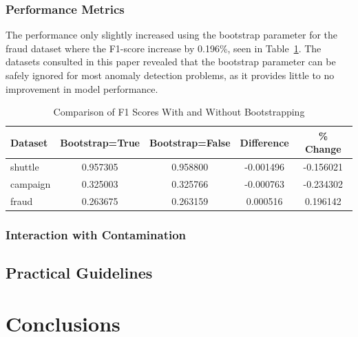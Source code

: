 \documentclass[10pt, conference]{IEEEtran}
\begin{document}
\subsubsection{Performance Metrics}
The performance only slightly increased using the bootstrap parameter for the fraud dataset where the F1-score  increase by 0.196\%, seen in Table~\ref{tab:bootstrap_comparison}. The datasets consulted in this paper revealed that the bootstrap parameter can be safely ignored for most anomaly detection problems, as it provides little to no improvement in model performance.
\begin{table}[htbp]
	\caption{Comparison of F1 Scores With and Without Bootstrapping}
	\centering
	\begin{tabular}{|l|c|c|c|c|}
		\hline
		\textbf{Dataset} & \textbf{Bootstrap=True} & \textbf{Bootstrap=False} & \textbf{Difference} & \textbf{\% Change} \\ 
		\hline
		shuttle & 0.957305 & 0.958800 & -0.001496 & -0.156021 \\ 
		\hline
		campaign & 0.325003 & 0.325766 & -0.000763 & -0.234302 \\ 
		\hline
		fraud & 0.263675 & 0.263159 & 0.000516 & 0.196142 \\ 
		\hline
	\end{tabular}
	\label{tab:bootstrap_comparison}
\end{table}



\subsubsection{Interaction with Contamination}



\subsection{Practical Guidelines}
\section{Conclusions}





\appendices
\end{document}
